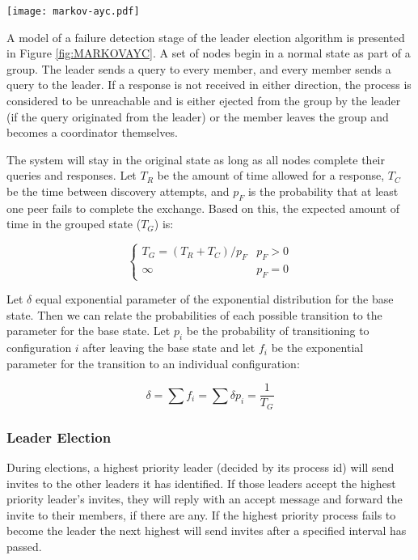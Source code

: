 \begin{figure*}
\centering
\texttt{[image: markov-ayc.pdf]}
\caption{A diagram showing a partial Markov chain for failure detection}
\label{fig:MARKOVAYC}
\end{figure*}

A model of a failure detection stage of the leader election algorithm is presented in Figure \ref{fig:MARKOVAYC}. A set of nodes begin in a normal state as part of a group. The leader sends a query to every member, and every member sends a query to the leader. If a response is not received in either direction, the process is considered to be unreachable and is either ejected from the group by the leader (if the query originated from the leader) or the member leaves the group and becomes a coordinator themselves.

The system will stay in the original state as long as all nodes complete their queries and responses. Let $T_{R}$ be the amount of time allowed for a response, $T_{C}$ be the time between discovery attempts, and $p_{F}$ is the probability that at least one peer fails to complete the exchange. Based on this, the expected amount of time in the grouped state ($T_{G}$) is:

\begin{equation}
\begin{cases}
T_{G} = ( T_{R}+T_{C}  ) / p_{F} & p_{F} > 0 \\
\infty & p_{F} = 0
\end{cases}
\end{equation}

Let $\delta$ equal exponential parameter of the exponential distribution for the base state. Then we can relate the probabilities of each possible transition to the parameter for the base state. Let $p_{i}$ be the probability of transitioning to configuration $i$ after leaving the base state and let $f_{i}$ be the exponential parameter for the transition to an individual configuration:

\begin{equation}
\delta = \sum f_{i} = \sum \delta p_{i} = \frac{1}{T_{G}}
\end{equation}

\subsubsection{Leader Election}
During elections, a highest priority leader (decided by its process id) will send invites to the other leaders it has identified. If those leaders accept the highest priority leader's invites, they will reply with an accept message and forward the invite to their members, if there are any. If the highest priority process fails to become the leader the next highest will send invites after a specified interval has passed.

